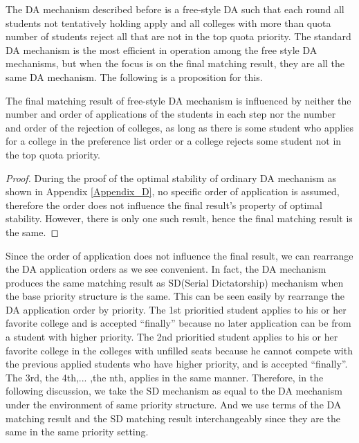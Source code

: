 The DA mechanism described before is a free-style DA such that each round all students not tentatively holding apply and all colleges with more than quota number of students reject all that are not in the top quota priority. The standard DA mechanism is the most efficient in operation among the free style DA mechanisms, but when the focus is on the final matching result, they are all the same DA mechanism. The following is a proposition for this.
\begin{prop}
  \label{irrelevant}
 The final
 matching result of free-style DA mechanism is  influenced by neither the number and order of applications of the students in each step nor the number and order of the rejection of colleges,  as long as there is some student who applies for a college in the preference list order  or a college rejects some student not in the top quota priority.
 
\end{prop}

\begin{proof}
  During the proof of the optimal stability of ordinary DA mechanism as shown in Appendix \ref{Appendix_D}, no specific order of application is assumed, therefore the order does not influence the final result's property of optimal stability. However, there is only one such result, hence the final matching result is the same.
\end{proof}

Since the order of application does not influence the final result, we can rearrange the DA application orders as we see convenient.
In fact, the DA mechanism produces the same matching result as  SD(Serial Dictatorship) mechanism when the base priority structure is the same. This can be seen easily by rearrange the DA application order by priority. The 1st prioritied student applies to his or her favorite college and is accepted ``finally'' because no later application can be from a student with higher priority. The 2nd prioritied student applies to his or her favorite college in the colleges with unfilled seats because he cannot compete with the previous applied students who have higher priority, and is accepted ``finally''. The 3rd, the 4th,... ,the nth, applies in the same manner.  Therefore, in the following discussion, we take the SD mechanism as equal to the DA mechanism under the environment of same priority structure. And we use terms of the DA matching result and the SD matching result interchangeably since they are the same in the same priority setting.

